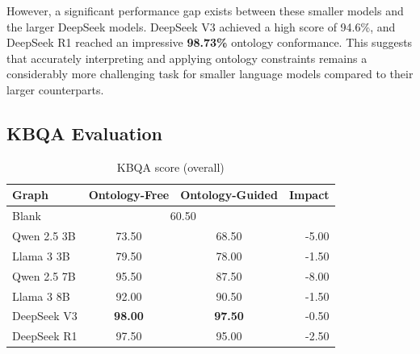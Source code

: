 \documentclass[a4, conference]{IEEEtran}
\begin{document}
However, a significant performance gap exists between these smaller models and the larger DeepSeek models. DeepSeek V3 achieved a high score of 94.6\%, and DeepSeek R1 reached an impressive \textbf{98.73\%} ontology conformance. This suggests that accurately interpreting and applying ontology constraints remains a considerably more challenging task for smaller language models compared to their larger counterparts.

\subsection{KBQA Evaluation}

\begin{table}[h]
    \centering
    \caption{KBQA score (overall)}
    \label{tab:qa_percent}
    \begin{tabular}{|l|c|c|r|}
        \hline
        Graph       & Ontology-Free               & Ontology-Guided & Impact \\
        \hline
        Blank       & \multicolumn{2}{|c|}{60.50} &                          \\
        \hline
        Qwen 2.5 3B & 73.50                       & 68.50           & -5.00  \\
        \hline
        Llama 3 3B  & 79.50                       & 78.00           & -1.50  \\
        \hline
        Qwen 2.5 7B & 95.50                       & 87.50           & -8.00  \\
        \hline
        Llama 3 8B  & 92.00                       & 90.50           & -1.50  \\
        \hline
        DeepSeek V3 & \textbf{98.00}              & \textbf{97.50}  & -0.50  \\
        \hline
        DeepSeek R1 & 97.50                       & 95.00           & -2.50  \\
        \hline
    \end{tabular}
\end{table}
\end{document}
